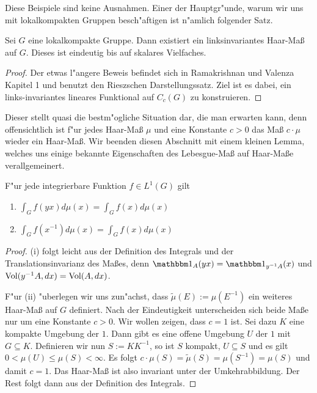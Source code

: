 	Diese Beispiele sind keine Ausnahmen.
	Einer der Hauptgr"unde, warum wir uns mit lokalkompakten Gruppen besch"aftigen ist n"amlich folgender Satz.
	\begin{satz}
	\label{satz:topo:haarmeasure}
		Sei $G$ eine lokalkompakte Gruppe. Dann existiert ein linksinvariantes Haar-Maß auf $G$. Dieses ist eindeutig bis auf skalares Vielfaches.
	\end{satz}
	\begin{proof}
		Der etwas l"angere Beweis befindet sich in Ramakrishnan und Valenza \cite{rama} Kapitel 1 und benutzt den Rieszschen Darstellungssatz.
		Ziel ist es dabei, ein links-invariantes lineares Funktional auf $C_c(G)$ zu konstruieren.
	\end{proof}
	Dieser stellt quasi die bestm"ogliche Situation dar, die man erwarten kann, denn offensichtlich ist f"ur jedes Haar-Maß $\mu$ und eine Konstante $c>0$ das Maß $c\cdot \mu$ wieder ein Haar-Maß. 
	Wir beenden diesen Abschnitt mit einem kleinen Lemma, welches uns einige bekannte Eigenschaften des Lebesgue-Maß auf Haar-Maße verallgemeinert.
	\begin{lemma}F"ur jede integrierbare Funktion $f\in L^{1}(G)$ gilt
		\begin{enumerate}[label=\emph{(\roman*)}]
			\item $\int_{G} f(yx)d\mu(x) = \int_{G} f(x)d\mu(x)$
			\item $\int_{G} f(x^{-1})d\mu(x) = \int_{G} f(x)d\mu(x)$
		\end{enumerate}
	\end{lemma}
	\begin{proof}
		(i) folgt leicht aus der Definition des Integrals und der Translationsinvarianz des Maßes, denn $\ind_A(yx) = \ind_{y^{-1}A}(x)$ und $\text{Vol}({y^{-1}A}, d{x}) = \text{Vol}(A,d{x})$.
		
		F"ur (ii) "uberlegen wir uns zun"achst, dass $\tilde{\mu}(E):= \mu(E^{-1})$ ein weiteres Haar-Maß auf $G$ definiert. 
		Nach der Eindeutigkeit unterscheiden sich beide Maße nur um eine Konstante $c > 0$. Wir wollen zeigen, dass $c=1$ ist.
		Sei dazu $K$ eine kompakte Umgebung der $1$. Dann gibt es eine offene Umgebung $U$ der $1$ mit $G \subseteq K$. Definieren wir nun $S := KK^{-1}$, so ist $S$ kompakt, $U \subseteq S$ und es gilt $0 < \mu(U) \leq \mu(S)<\infty$. 
		Es folgt $ c\cdot \mu(S) = \tilde{\mu}(S) = \mu(S^{-1}) =\mu(S)$ und damit $c=1$. Das Haar-Maß ist also invariant unter der Umkehrabbildung. Der Rest folgt dann aus der Definition des Integrals.
	\end{proof}
	
